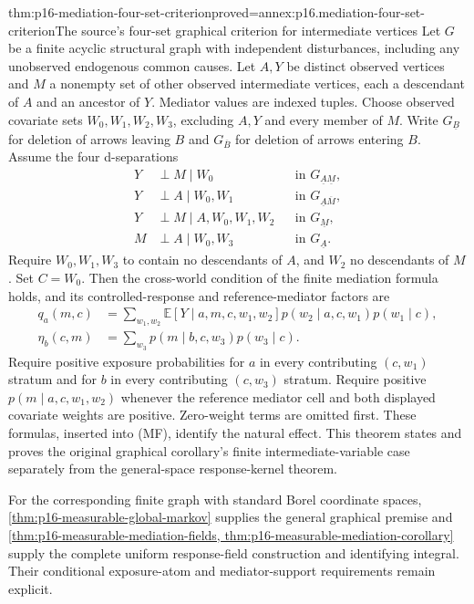 \begin{hbtheorem}{thm:p16-mediation-four-set-criterion}{proved=annex:p16.mediation-four-set-criterion}{The source's four-set graphical criterion for intermediate vertices}
Let \(G\) be a finite acyclic structural graph with independent
disturbances, including any unobserved endogenous common causes.
Let \(A,Y\) be distinct observed vertices and \(M\) a nonempty set of
other observed intermediate vertices, each a descendant of \(A\) and an ancestor
of \(Y\). Mediator values are indexed tuples. Choose observed covariate sets
\(W_0,W_1,W_2,W_3\), excluding \(A,Y\) and every member of \(M\). Write
\(G_{\underline B}\) for deletion of arrows leaving \(B\) and
\(G_{\overline B}\) for deletion of arrows entering \(B\).
Assume the four d-separations
\[
\begin{aligned}
 Y&\perp M\mid W_0 &&\text{in }G_{\underline A\underline M},\\
 Y&\perp A\mid W_0,W_1 &&\text{in }G_{\underline A\overline M},\\
 Y&\perp M\mid A,W_0,W_1,W_2 &&\text{in }G_{\underline M},\\
 M&\perp A\mid W_0,W_3 &&\text{in }G_{\underline A}.
\end{aligned}
\]
Require \(W_0,W_1,W_3\) to contain no descendants of \(A\), and
\(W_2\) no descendants of \(M\). Set \(C=W_0\). Then the
cross-world condition of the finite mediation formula holds, and its
controlled-response and reference-mediator factors are
\[
\begin{aligned}
 q_a(m,c)&=\sum_{w_1,w_2}\mathbb E[Y\mid a,m,c,w_1,w_2]
             p(w_2\mid a,c,w_1)p(w_1\mid c),\\
 \eta_b(c,m)&=\sum_{w_3}p(m\mid b,c,w_3)p(w_3\mid c).
\end{aligned}
\]
Require positive exposure probabilities for \(a\) in every contributing
\((c,w_1)\) stratum and for \(b\) in every contributing \((c,w_3)\)
stratum. Require positive \(p(m\mid a,c,w_1,w_2)\) whenever the
reference mediator cell and both displayed covariate weights are positive.
Zero-weight terms are omitted first. These formulas, inserted into (MF),
identify the natural effect. This theorem states and proves the original
graphical corollary's finite intermediate-variable case separately from the
general-space response-kernel theorem.
\end{hbtheorem}

For the corresponding finite graph with standard Borel coordinate spaces,
\cref{thm:p16-measurable-global-markov} supplies the general graphical
premise and \cref{thm:p16-measurable-mediation-fields,
thm:p16-measurable-mediation-corollary} supply the complete uniform
response-field construction and identifying integral. Their conditional
exposure-atom and mediator-support requirements remain explicit.

